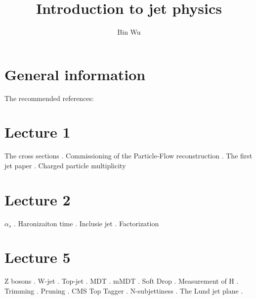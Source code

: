\documentclass[onecolumn,noshowpacs,superscriptaddress,nobibnotes,nofootinbib,12pt,showkeys,preprintnumbers]{revtex4-1}
\begin{document}
\title{Introduction to jet physics}
\author{Bin Wu}
\maketitle

\section{General information}

The recommended references: \cite{Salam:2009jx, Marzani:2019hun}

\section{Lecture 1}

The cross sections \cite{Antchev:2017dia}. Commissioning of the Particle-Flow reconstruction \cite{CMS:2010eua}. The first jet paper \cite{Sterman:1977wj}. Charged particle multiplicity \cite{Aad:2016mok}

\section{Lecture 2}

$\alpha_s$ \cite{Bethke:2019rxn}. Haronizaiton time \cite{Dokshitzer:1991wu}. Inclusie jet \cite{Aaboud:2017wsi}. Factorization \cite{Sterman:2014nua, Becher:2014oda}

\section{Lecture 5}
Z bosons \cite{Khachatryan:2016nbe}. W-jet \cite{Chatrchyan:2012ku}. Top-jet \cite{TheATLAScollaboration:2013qia, Schaetzel:2014kha}. MDT \cite{Butterworth:2008iy}. mMDT \cite{Dasgupta:2013ihk}. Soft Drop \cite{Larkoski:2014wba}. Measurement of H \cite{Sirunyan:2017dgc}. Trimming \cite{Krohn:2009th}. Pruning \cite{Ellis:2009me}. CMS Top Tagger \cite{CMS:2014fya}. N-subjettiness \cite{Thaler:2010tr}. The Lund jet plane \cite{Dreyer:2018nbf}. 



\end{document}
